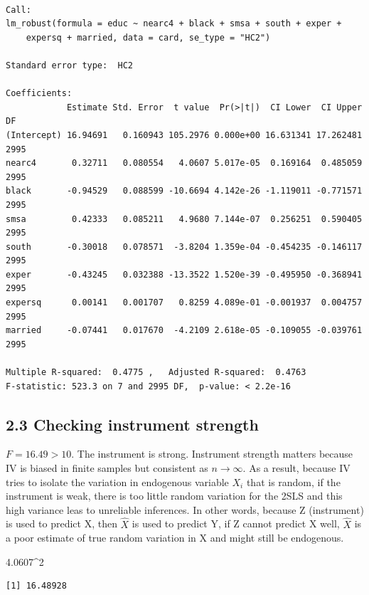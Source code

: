 \documentclass[
  letterpaper,
  DIV=11,
  numbers=noendperiod]{scrartcl}
\newenvironment{Shaded}{\begin{snugshade}}{\end{snugshade}}
\newcommand{\DecValTok}[1]{\textcolor[rgb]{0.68,0.00,0.00}{#1}}
\newcommand{\FloatTok}[1]{\textcolor[rgb]{0.68,0.00,0.00}{#1}}
\newcommand{\SpecialCharTok}[1]{\textcolor[rgb]{0.37,0.37,0.37}{#1}}
\begin{document}
\begin{verbatim}

Call:
lm_robust(formula = educ ~ nearc4 + black + smsa + south + exper + 
    expersq + married, data = card, se_type = "HC2")

Standard error type:  HC2 

Coefficients:
            Estimate Std. Error  t value  Pr(>|t|)  CI Lower  CI Upper   DF
(Intercept) 16.94691   0.160943 105.2976 0.000e+00 16.631341 17.262481 2995
nearc4       0.32711   0.080554   4.0607 5.017e-05  0.169164  0.485059 2995
black       -0.94529   0.088599 -10.6694 4.142e-26 -1.119011 -0.771571 2995
smsa         0.42333   0.085211   4.9680 7.144e-07  0.256251  0.590405 2995
south       -0.30018   0.078571  -3.8204 1.359e-04 -0.454235 -0.146117 2995
exper       -0.43245   0.032388 -13.3522 1.520e-39 -0.495950 -0.368941 2995
expersq      0.00141   0.001707   0.8259 4.089e-01 -0.001937  0.004757 2995
married     -0.07441   0.017670  -4.2109 2.618e-05 -0.109055 -0.039761 2995

Multiple R-squared:  0.4775 ,   Adjusted R-squared:  0.4763 
F-statistic: 523.3 on 7 and 2995 DF,  p-value: < 2.2e-16
\end{verbatim}

\subsection{2.3 Checking instrument
strength}\label{checking-instrument-strength}

\(F = 16.49 > 10\). The instrument is strong. Instrument strength
matters because IV is biased in finite samples but consistent as
\(n \rightarrow \infty\). As a result, because IV tries to isolate the
variation in endogenous variable \(X_i\) that is random, if the
instrument is weak, there is too little random variation for the 2SLS
and this high variance leas to unreliable inferences. In other words,
because Z (instrument) is used to predict X, then \(\hat{X}\) is used to
predict Y, if Z cannot predict X well, \(\hat{X}\) is a poor estimate of
true random variation in X and might still be endogenous.

\begin{Shaded}
\begin{Highlighting}[]
\FloatTok{4.0607}\SpecialCharTok{\^{}}\DecValTok{2}
\end{Highlighting}
\end{Shaded}

\begin{verbatim}
[1] 16.48928
\end{verbatim}
\end{document}
